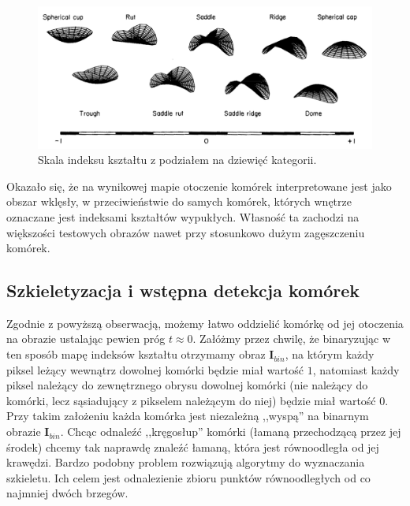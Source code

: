 \documentclass[declaration,shortabstract,mgr]{iithesis}
\newcommand{\image}{\mathbf{I}}
\begin{document}
\begin{figure}
  \includegraphics[width=\textwidth]{images/shape-index-range.png}
  \caption{Skala indeksu kształtu z podziałem na dziewięć kategorii. \cite{paper:shape-index}}
  \label{fig:shape-index-range}
\end{figure}

Okazało się, że na wynikowej mapie otoczenie komórek interpretowane jest jako obszar wklęsły, w przeciwieństwie do samych komórek, których wnętrze oznaczane jest indeksami kształtów wypukłych. Własność ta zachodzi na większości testowych obrazów nawet przy stosunkowo dużym zagęszczeniu komórek.

\subsection{Szkieletyzacja i wstępna detekcja komórek}

Zgodnie z powyższą obserwacją, możemy łatwo oddzielić komórkę od jej otoczenia na obrazie ustalając pewien próg $t \approx 0$. Załóżmy przez chwilę, że binaryzując w ten sposób mapę indeksów kształtu otrzymamy obraz $\image_{bin}$, na którym każdy piksel leżący wewnątrz dowolnej komórki będzie miał wartość $1$, natomiast każdy piksel należący do zewnętrznego obrysu dowolnej komórki (nie należący do komórki, lecz sąsiadujący z pikselem należącym do niej) będzie miał wartość $0$.
Przy takim założeniu każda komórka jest niezależną ,,wyspą'' na binarnym obrazie $\image_{bin}$. Chcąc odnaleźć ,,kręgosłup'' komórki (łamaną przechodzącą przez jej środek) chcemy tak naprawdę znaleźć łamaną, która jest równoodległa od jej krawędzi. Bardzo podobny problem rozwiązują algorytmy do wyznaczania szkieletu. Ich celem jest odnalezienie zbioru punktów równoodległych od co najmniej dwóch brzegów.
\end{document}
